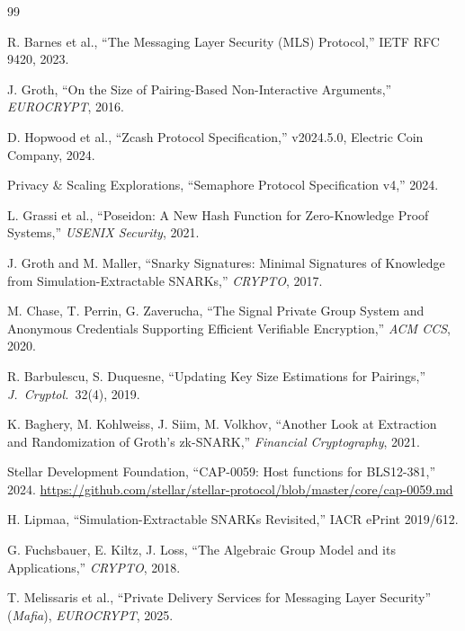 \documentclass[11pt,a4paper]{article}
\begin{document}
\begin{thebibliography}{99}

R. Barnes et al.,
``The Messaging Layer Security (MLS) Protocol,''
IETF RFC 9420, 2023.

J. Groth,
``On the Size of Pairing-Based Non-Interactive Arguments,''
\emph{EUROCRYPT}, 2016.

D. Hopwood et al.,
``Zcash Protocol Specification,''
v2024.5.0, Electric Coin Company, 2024.

Privacy \& Scaling Explorations,
``Semaphore Protocol Specification v4,''
2024.

L. Grassi et al.,
``Poseidon: A New Hash Function for Zero-Knowledge Proof Systems,''
\emph{USENIX Security}, 2021.

J. Groth and M. Maller,
``Snarky Signatures: Minimal Signatures of Knowledge from Simulation-Extractable SNARKs,''
\emph{CRYPTO}, 2017.

M. Chase, T. Perrin, G. Zaverucha,
``The Signal Private Group System and Anonymous Credentials Supporting Efficient Verifiable Encryption,''
\emph{ACM CCS}, 2020.

R. Barbulescu, S. Duquesne,
``Updating Key Size Estimations for Pairings,''
\emph{J.\ Cryptol.}\ 32(4), 2019.

K. Baghery, M. Kohlweiss, J. Siim, M. Volkhov,
``Another Look at Extraction and Randomization of Groth's zk-SNARK,''
\emph{Financial Cryptography}, 2021.

Stellar Development Foundation,
``CAP-0059: Host functions for BLS12-381,''
2024. \url{https://github.com/stellar/stellar-protocol/blob/master/core/cap-0059.md}

H. Lipmaa,
``Simulation-Extractable SNARKs Revisited,''
IACR ePrint 2019/612.

G. Fuchsbauer, E. Kiltz, J. Loss,
``The Algebraic Group Model and its Applications,''
\emph{CRYPTO}, 2018.

T. Melissaris et al.,
``Private Delivery Services for Messaging Layer Security'' (\emph{Mafia}),
\emph{EUROCRYPT}, 2025.

\end{thebibliography}
\end{document}
